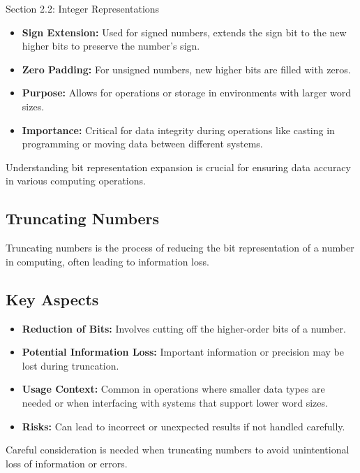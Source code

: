 \begin{notes}{Section 2.2: Integer Representations}
    \begin{itemize}
        \item \textbf{Sign Extension:} Used for signed numbers, extends the sign bit to the new higher bits to preserve the number's sign.
        \item \textbf{Zero Padding:} For unsigned numbers, new higher bits are filled with zeros.
        \item \textbf{Purpose:} Allows for operations or storage in environments with larger word sizes.
        \item \textbf{Importance:} Critical for data integrity during operations like casting in programming or moving data between different systems.
    \end{itemize}
    
    Understanding bit representation expansion is crucial for ensuring data accuracy in various computing operations.

    \subsection*{Truncating Numbers}

    Truncating numbers is the process of reducing the bit representation of a number in computing, often leading to information loss.
    
    \subsection*{Key Aspects}

    \begin{itemize}
        \item \textbf{Reduction of Bits:} Involves cutting off the higher-order bits of a number.
        \item \textbf{Potential Information Loss:} Important information or precision may be lost during truncation.
        \item \textbf{Usage Context:} Common in operations where smaller data types are needed or when interfacing with systems that support lower word sizes.
        \item \textbf{Risks:} Can lead to incorrect or unexpected results if not handled carefully.
    \end{itemize}
    
    Careful consideration is needed when truncating numbers to avoid unintentional loss of information or errors.    
\end{notes}

